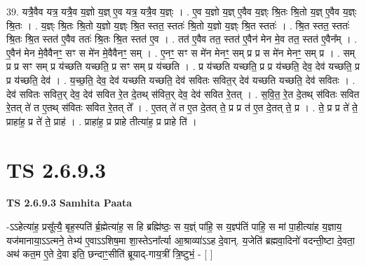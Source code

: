 \documentclass[17pt]{extarticle}
\begin{document}
39. यत्रै॒वैव यत्र॒ यत्रै॒व य॒ज्ञो य॒ज्ञ् ए॒व यत्र॒ यत्रै॒व य॒ज्ञ्ः । . ए॒व य॒ज्ञो य॒ज्ञ् ए॒वैव य॒ज्ञ्ः श्रि॒तः श्रि॒तो य॒ज्ञ् ए॒वैव य॒ज्ञ्ः श्रि॒तः । . य॒ज्ञ्ः श्रि॒तः श्रि॒तो य॒ज्ञो य॒ज्ञ्ः श्रि॒त स्तत॒ स्ततः॑ श्रि॒तो य॒ज्ञो य॒ज्ञ्ः श्रि॒त स्ततः॑ । . श्रि॒त स्तत॒ स्ततः॑ श्रि॒तः श्रि॒त स्तत॑ ए॒वैव ततः॑ श्रि॒तः श्रि॒त स्तत॑ ए॒व । . तत॑ ए॒वैव तत॒ स्तत॑ ए॒वैन॑ मेन मे॒व तत॒ स्तत॑ ए॒वैन᳚म् । . ए॒वैन॑ मेन मे॒वैवैनꣳ॒॒ सꣳ स मे॑न मे॒वैवैनꣳ॒॒ सम् । . ए॒नꣳ॒॒ सꣳ स मे॑न मेनꣳ॒॒ सम् प्र प्र स मे॑न मेनꣳ॒॒ सम् प्र । . सम् प्र प्र सꣳ सम् प्र य॑च्छति यच्छति॒ प्र सꣳ सम् प्र य॑च्छति । . प्र य॑च्छति यच्छति॒ प्र प्र य॑च्छति॒ देव॒ देव॑ यच्छति॒ प्र प्र य॑च्छति॒ देव॑ । . य॒च्छ॒ति॒ देव॒ देव॑ यच्छति यच्छति॒ देव॑ सवितः सवित॒र् देव॑ यच्छति यच्छति॒ देव॑ सवितः । . देव॑ सवितः सवित॒र् देव॒ देव॑ सवित रे॒त दे॒तथ् स॑वित॒र् देव॒ देव॑ सवित रे॒तत् । . स॒वि॒त॒ रे॒त दे॒तथ् स॑वितः सवित रे॒तत् ते॑ त ए॒तथ् स॑वितः सवित रे॒तत् ते᳚ । . ए॒तत् ते॑ त ए॒त दे॒तत् ते॒ प्र प्र त॑ ए॒त दे॒तत् ते॒ प्र । . ते॒ प्र प्र ते॑ ते॒ प्राहा॑ह॒ प्र ते॑ ते॒ प्राह॑ । . प्राहा॑ह॒ प्र प्राहे तीत्या॑ह॒ प्र प्राहे ति॑ । \newline
\pagebreak
{}

\section{ TS 2.6.9.3 }

\textbf{TS 2.6.9.3 } \newline
\textbf{Samhita Paata} \newline

-ऽऽहेत्या॑ह॒ प्रसू᳚त्यै॒ बृह॒स्पति॑ र्ब्र॒ह्मेत्या॑ह॒ स हि ब्रह्मि॑ष्ठः॒ स य॒ज्ञ्ं पा॑हि॒ स य॒ज्ञ्प॑तिं पाहि॒ स मां पा॒हीत्या॑ह य॒ज्ञाय॒ यज॑मानाया॒ऽऽत्मने॒ तेभ्य॑ ए॒वाऽऽशिष॒मा शा॒स्तेऽना᳚र्त्या आ॒श्राव्या॑ऽऽह दे॒वान्. य॒जेति॑ ब्रह्मवा॒दिनो॑ वदन्ती॒ष्टा दे॒वता॒ अथ॑ कत॒म ए॒ते दे॒वा इति॒ छन्दाꣳ॒॒सीति॑ ब्रूयाद्-गाय॒त्रीं त्रि॒ष्टुभं॒ - [  ] \newline
\end{document}
